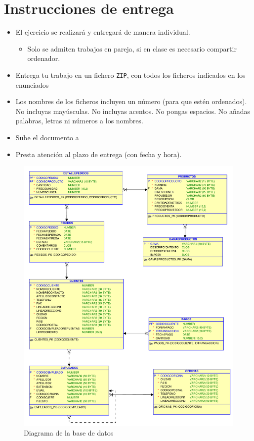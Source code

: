 \newpage
\section{Instrucciones de entrega}
\begin{itemize}
\item El ejercicio se realizará y entregará de manera individual.
  \begin{itemize}
  \item Solo se admiten trabajos en pareja, si en clase es necesario compartir ordenador.
  \end{itemize}
\item Entrega tu trabajo en un fichero \texttt{ZIP}, con todos los ficheros indicados en los enunciados
\item Los nombres de los ficheros incluyen un número (para que estén ordenados). No incluyas mayúsculas. No incluyas acentos. No pongas espacios. No añadas palabras, letras ni números a los nombres.
\item Sube el documento a 
\item Presta atención al plazo de entrega (con fecha y hora).  
\end{itemize}



\begin{figure}[h]
  \begin{center}
    \includegraphics[width=1\textwidth]{./jardineria.pdf}
  \end{center}
  \caption{Diagrama de la base de datos}\label{fig:esquema}
\end{figure}






